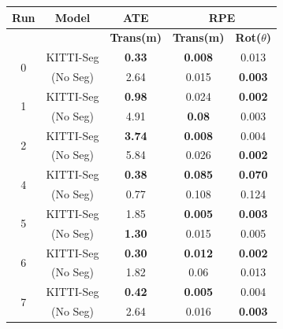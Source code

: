 \begin{table}[H]
\scriptsize
\centering
\begin{tabular}{|c|c|c|c|c|}
\hline
\textbf{Run}                 & \textbf{Model}                        & \textbf{ATE}            & \multicolumn{2}{|c|}{{\textbf{RPE}}}   \\ \hline
                 &                         &       \textbf{Trans(m)}      &  \textbf{Trans(m)}      & \textbf{Rot($\theta$)}        \\ \hline
\multirow{2}{*}{0}  
& KITTI-Seg            &     \textbf{0.33}          & \textbf{0.008}          & 0.013          \\  
& \dslruda{} (No Seg)              & 2.64  & 0.015 & \textbf{0.003}  \\ 
\hline
\multirow{2}{*}{1}  
& KITTI-Seg            & \textbf{0.98}         & 0.024          & \textbf{0.002}          \\  
& \dslruda{} (No Seg)              &     4.91   &  \textbf{0.08}   &    0.003 \\\hline

\multirow{2}{*}{2} 
& KITTI-Seg            & \textbf{3.74}         & \textbf{0.008}          & 0.004           \\  
& \dslruda{} (No Seg)              & 5.84   & 0.026 & \textbf{0.002} \\\hline

\multirow{2}{*}{4}
& KITTI-Seg            &         \textbf{0.38} & \textbf{0.085}          & \textbf{0.070}          \\  
& \dslruda{} (No Seg)              & 0.77           & 0.108 & 0.124 \\\hline
\multirow{2}{*}{5}

& KITTI-Seg            &     1.85          & \textbf{0.005}          & \textbf{0.003}          \\  
& \dslruda{} (No Seg)              & \textbf{1.30} & 0.015 & 0.005 \\\hline
\multirow{2}{*}{6}  
& KITTI-Seg            &        \textbf{0.30}         &    \textbf{0.012}        &   \textbf{0.002}        \\  
& \dslruda{} (No Seg)              & 1.82           & 0.06  & 0.013 \\\hline
\multirow{2}{*}{7}  

& KITTI-Seg            &       \textbf{0.42}          & \textbf{0.005}          & 0.004          \\  
& \dslruda{} (No Seg)              & 2.64           & 0.016 & \textbf{0.003} \\\hline


\end{tabular}
\end{table}
